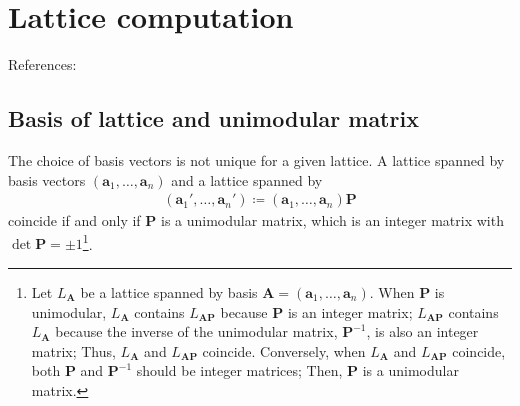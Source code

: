\section{\label{sec:lattice}Lattice computation}

References: \cite{Hart2008,Hart2009,Cohen1993,CSE206A}

\subsection{Basis of lattice and unimodular matrix}

The choice of basis vectors is not unique for a given lattice.
A lattice spanned by basis vectors $( \bm{a}_{1}, \dots, \bm{a}_{n} )$ and a lattice spanned by
\begin{align}
  ( \bm{a}_{1}', \dots, \bm{a}_{n}' ) \coloneqq ( \bm{a}_{1}, \dots, \bm{a}_{n} ) \bm{P}
\end{align}
coincide if and only if $\bm{P}$ is a unimodular matrix, which is an integer matrix with $\det \bm{P} = \pm 1$\footnote{
  Let $L_{\bm{A}}$ be a lattice spanned by basis $\bm{A} = ( \bm{a}_{1}, \dots, \bm{a}_{n} )$.
  When $\bm{P}$ is unimodular, $L_{\bm{A}}$ contains $L_{\bm{AP}}$ because $\bm{P}$ is an integer matrix; $L_{\bm{AP}}$ contains $L_{\bm{A}}$ because the inverse of the unimodular matrix, $\bm{P}^{-1}$, is also an integer matrix; Thus, $L_{\bm{A}}$ and $L_{\bm{AP}}$ coincide.
  Conversely, when $L_{\bm{A}}$ and $L_{\bm{AP}}$ coincide, both $\bm{P}$ and $\bm{P}^{-1}$ should be integer matrices; Then, $\bm{P}$ is a unimodular matrix.
}.

%
%

